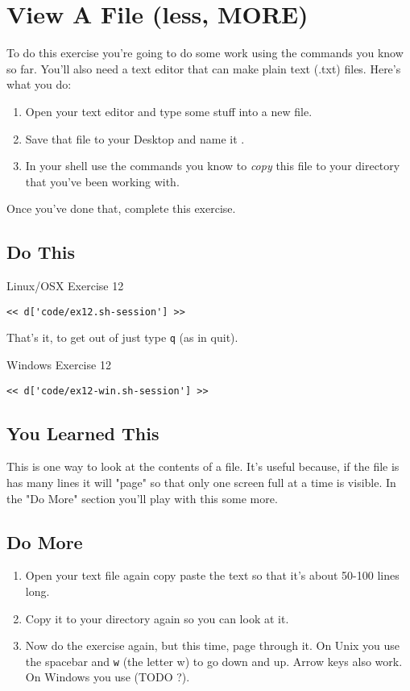 \chapter{View A File (less, MORE)}

To do this exercise you're going to do some work using the commands you know so far.
You'll also need a text editor that can make plain text (.txt) files.  Here's
what you do:

\begin{enumerate}
\item Open your text editor and type some stuff into a new file.
\item Save that file to your Desktop and name it .
\item In your shell use the commands you know to \emph{copy} this file
    to your  directory that you've been working with.
\end{enumerate}

Once you've done that, complete this exercise.

\section{Do This}

\begin{code}{Linux/OSX Exercise 12}
\begin{Verbatim}
<< d['code/ex12.sh-session'] >>
\end{Verbatim}
\end{code}

That's it, to get out of  just type \verb|q| (as in quit).

\begin{code}{Windows Exercise 12}
\begin{Verbatim}
<< d['code/ex12-win.sh-session'] >>
\end{Verbatim}
\end{code}

\section{You Learned This}

This is one way to look at the contents of a file.  It's useful because, if the
file is has many lines it will "page" so that only one screen full at a time
is visible.  In the "Do More" section you'll play with this some more.


\section{Do More}

\begin{enumerate}
\item Open your text file again copy paste the text so that it's about 50-100 lines long.
\item Copy it to your  directory again so you can look at it.
\item Now do the exercise again, but this time, page through it.  On Unix you use
    the spacebar and \verb|w| (the letter w) to go down and up.  Arrow keys also work.  On Windows you use (TODO ?).
\end{enumerate}

